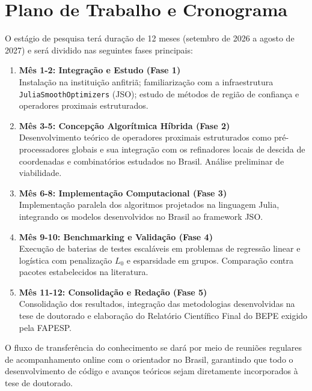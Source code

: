 \section{Plano de Trabalho e Cronograma}

O estágio de pesquisa terá duração de 12 meses (setembro de 2026 a agosto de 2027) e será dividido nas seguintes fases principais:

\begin{enumerate}
    \item \textbf{Mês 1-2: Integração e Estudo (Fase 1)} \\
    Instalação na instituição anfitriã; familiarização com a infraestrutura \texttt{JuliaSmoothOptimizers} (JSO); estudo de métodos de região de confiança e operadores proximais estruturados.
    \item \textbf{Mês 3-5: Concepção Algorítmica Híbrida (Fase 2)} \\
    Desenvolvimento teórico de operadores proximais estruturados como pré-processadores globais e sua integração com os refinadores locais de descida de coordenadas e combinatórios estudados no Brasil. Análise preliminar de viabilidade.
    \item \textbf{Mês 6-8: Implementação Computacional (Fase 3)} \\
    Implementação paralela dos algoritmos projetados na linguagem Julia, integrando os modelos desenvolvidos no Brasil ao framework JSO.
    \item \textbf{Mês 9-10: Benchmarking e Validação (Fase 4)} \\
    Execução de baterias de testes escaláveis em problemas de regressão linear e logística com penalização $L_0$ e esparsidade em grupos. Comparação contra pacotes estabelecidos na literatura.
    \item \textbf{Mês 11-12: Consolidação e Redação (Fase 5)} \\
    Consolidação dos resultados, integração das metodologias desenvolvidas na tese de doutorado e elaboração do Relatório Científico Final do BEPE exigido pela FAPESP.
\end{enumerate}

O fluxo de transferência do conhecimento se dará por meio de reuniões regulares de acompanhamento online com o orientador no Brasil, garantindo que todo o desenvolvimento de código e avanços teóricos sejam diretamente incorporados à tese de doutorado.
